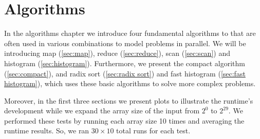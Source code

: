 \chapter{Algorithms}
\label{chap:algorithms}

In the algorithms chapter we introduce four fundamental algorithms to that are often used in various combinations to model problems in parallel.\cite{udacity}
We will be introducing map (\cref{sec:map}), reduce (\cref{sec:reduce}), scan (\cref{sec:scan}) and histogram (\cref{sec:histogram}).
Furthermore, we present the compact algorithm (\cref{sec:compact}), and radix sort (\cref{sec:radix sort}) and fast histogram (\cref{sec:fast histogram}), which uses these basic algorithms to solve more complex problems.

Moreover, in the first three sections we present plots to illustrate the runtime's development while we expand the array size of the input from $2^0$ to $2^{29}$.
We performed these tests by running each array size 10 times and averaging the runtime results.
So, we ran $30 \times 10$ total runs for each test.








